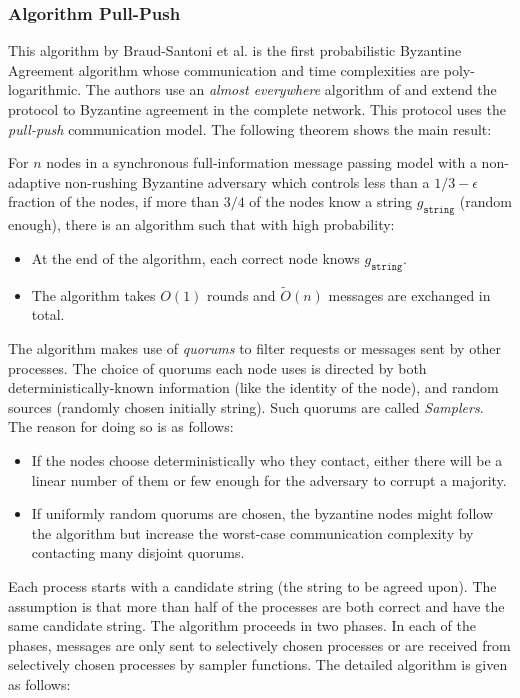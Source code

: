 


\subsubsection{Algorithm Pull-Push}
This algorithm by Braud-Santoni et al. \cite{BGH13} is the first probabilistic Byzantine Agreement algorithm whose communication and time complexities are poly-logarithmic. The authors use an \textit{almost everywhere} algorithm of \cite{KSSV06} and extend the protocol to Byzantine agreement in the complete network. This protocol uses the \textit{pull-push} communication model. The following theorem shows the main result: 


\begin{theorem}
For $n$ nodes in a synchronous full-information message passing model with a non-adaptive non-rushing Byzantine adversary which controls less than a $1/3 - \epsilon$ fraction of the nodes, if more than $3/4$ of the nodes know a string $g_{\mathtt{string}}$ (random enough), there is an algorithm such that with high probability:
\begin{itemize}
\item At the end of the algorithm, each correct node knows $g_{\mathtt{string}}$.
\item The algorithm takes $O(1)$ rounds and $\tilde{O}(n)$ messages are exchanged in total. 
\end{itemize}
\end{theorem}

The algorithm makes use of \textit{quorums} to filter requests or messages sent by other processes. The choice of quorums each node uses is directed by both deterministically-known information (like the identity of the node), and random sources (randomly chosen initially string). Such quorums are called \textit{Samplers}. The reason for doing so is as follows:
\begin{itemize}
\item If the nodes choose deterministically who they contact, either there will be a linear number of them or few enough for the adversary to corrupt a majority. 
\item If uniformly random quorums are chosen, the byzantine nodes might follow the algorithm but increase the worst-case communication complexity by contacting many disjoint quorums. 
\end{itemize}

Each process starts with a candidate string (the string to be agreed upon). The assumption is that more than half of the processes are both correct and have the same candidate string. The algorithm proceeds in two phases. In each of the phases, messages are only sent to selectively chosen processes or are received from selectively chosen processes by sampler functions. The detailed algorithm is given as follows:


